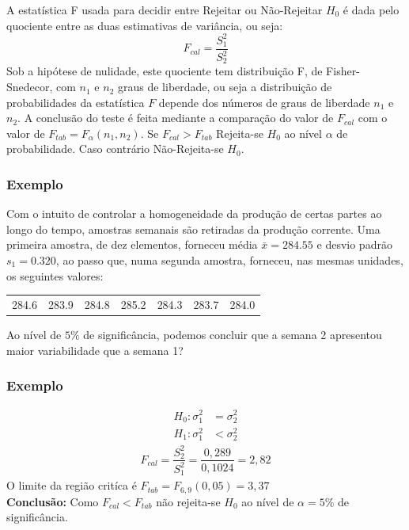 \documentclass[14pt,aspectratio=1610]{beamer}
\newcommand{\bx}{\ensuremath{\bar{x}}}
\newcommand{\Ho}{\ensuremath{H_{0}}}
\begin{document}
\begin{frame}{}
\frametitle{}
\begin{block}{}
\justifying
A estatística F usada para decidir entre Rejeitar ou Não-Rejeitar $\Ho$ é dada pelo quociente entre as duas estimativas de variância, ou seja:
$$F_{cal}=\dfrac{S_{1}^{2}}{S_{2}^{2}}$$
Sob a hipótese de nulidade, este quociente tem distribuição F, de Fisher-Snedecor, com $n_{1}$ e $n_{2}$ graus de liberdade, ou seja a distribuição de probabilidades 
da estatística $F$ depende dos números de graus de liberdade $n_{1}$ e $n_{2}$. A conclusão do teste é feita mediante a comparação do valor de $F_{cal}$ com o 
valor de $F_{tab}=F_{\alpha}(n_{1},n_{2}).$ Se $F_{cal}>F_{tab}$ Rejeita-se $\Ho$ ao nível $\alpha$ de probabilidade. Caso contrário Não-Rejeita-se $\Ho.$
\end{block}
\end{frame}

\begin{frame}{}
\frametitle{Exemplo}
\begin{block}{}
\justifying
Com o intuito de controlar a homogeneidade da produção de certas partes ao longo do tempo, amostras semanais são retiradas da produção corrente. Uma primeira 
amostra, de dez elementos, forneceu média $\bx=284.55$ e desvio padrão $s_{1}=0.320$, ao passo que, numa segunda amostra, forneceu, nas mesmas unidades, os seguintes valores:
\begin{table}[]
\begin{tabular}{ccccccc}
             284.6 & 283.9 & 284.8 & 285.2 & 284.3 & 283.7 & 284.0\\ 
\end{tabular}
\end{table}
Ao nível de $5\%$ de significância, podemos concluir que a semana 2 apresentou maior variabilidade que a semana 1?
\end{block}
\end{frame}

\begin{frame}{}
\frametitle{Exemplo}
\begin{block}{}
\justifying
\begin{align*}
H_{0}: \sigma_{1}^{2}&=\sigma_{2}^{2} \\ 
H_{1}: \sigma_{1}^{2}&<\sigma_{2}^{2}
\end{align*}
\begin{align}
F_{cal}=\dfrac{S_{2}^{2}}{S_{1}^{2}}=\dfrac{0,289}{0,1024}=2,82
\end{align}
O limite da região critíca é $F_{tab}=F_{6,9}(0,05)=3,37$\\
\textbf{Conclusão:} Como $F_{cal}<F_{tab}$ não rejeita-se $\Ho$ ao nível de $\alpha=5\%$ de significância. 
\end{block}
\end{frame}
\end{document}
